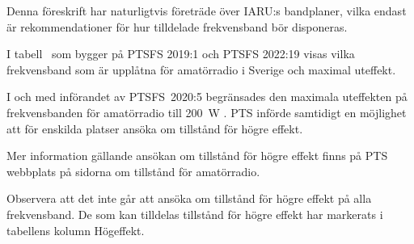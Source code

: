 Denna föreskrift har naturligtvis företräde över IARU:s bandplaner, vilka
endast är rekommendationer för hur tilldelade frekvensband bör disponeras.

I tabell~ som bygger på PTSFS 2019:1 och PTSFS 2022:19
visas vilka frekvensband som är upplåtna för amatörradio i Sverige och maximal
uteffekt.

I och med införandet av PTSFS~2020:5 begränsades den maximala uteffekten på
frekvensbanden för amatörradio till \qty{200}{\watt} \pep.
PTS införde samtidigt en möjlighet att för enskilda platser ansöka om tillstånd
för högre effekt.

Mer information gällande ansökan om tillstånd för högre effekt finns på PTS
webbplats på sidorna om tillstånd för amatörradio.

Observera att det inte går att ansöka om tillstånd för högre effekt på alla
frekvensband.
De som kan tilldelas tillstånd för högre effekt har markerats i tabellens kolumn
Högeffekt.

